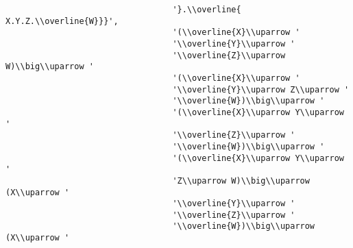 \begin{verbatim}
                                  '}.\\overline{ X.Y.Z.\\overline{W}}}',
                                  '(\\overline{X}\\uparrow '
                                  '\\overline{Y}\\uparrow '
                                  '\\overline{Z}\\uparrow W)\\big\\uparrow '
                                  '(\\overline{X}\\uparrow '
                                  '\\overline{Y}\\uparrow Z\\uparrow '
                                  '\\overline{W})\\big\\uparrow '
                                  '(\\overline{X}\\uparrow Y\\uparrow '
                                  '\\overline{Z}\\uparrow '
                                  '\\overline{W})\\big\\uparrow '
                                  '(\\overline{X}\\uparrow Y\\uparrow '
                                  'Z\\uparrow W)\\big\\uparrow (X\\uparrow '
                                  '\\overline{Y}\\uparrow '
                                  '\\overline{Z}\\uparrow '
                                  '\\overline{W})\\big\\uparrow (X\\uparrow '

\end{verbatim}
